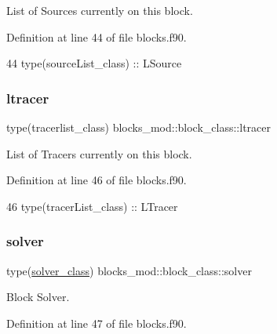 List of Sources currently on this block. 



Definition at line 44 of file blocks.\+f90.


\begin{DoxyCode}
44         \textcolor{keywordtype}{type}(sourceList\_class) :: LSource
\end{DoxyCode}
\mbox{\label{structblocks__mod_1_1block__class_ab4e2108886a09ba919d01474503f6165}} 
\subsubsection{\texorpdfstring{ltracer}{ltracer}}
{\footnotesize\ttfamily type(tracerlist\+\_\+class) blocks\+\_\+mod\+::block\+\_\+class\+::ltracer\hspace{0.3cm}{\ttfamily [private]}}



List of Tracers currently on this block. 



Definition at line 46 of file blocks.\+f90.


\begin{DoxyCode}
46         \textcolor{keywordtype}{type}(tracerList\_class) :: LTracer
\end{DoxyCode}
\mbox{\label{structblocks__mod_1_1block__class_a081258113128b3bcdefdbeac4bc5d039}} 
\subsubsection{\texorpdfstring{solver}{solver}}
{\footnotesize\ttfamily type(\mbox{\hyperlink{structsolver__mod_1_1solver__class}{solver\+\_\+class}}) blocks\+\_\+mod\+::block\+\_\+class\+::solver\hspace{0.3cm}{\ttfamily [private]}}



Block Solver. 



Definition at line 47 of file blocks.\+f90.


